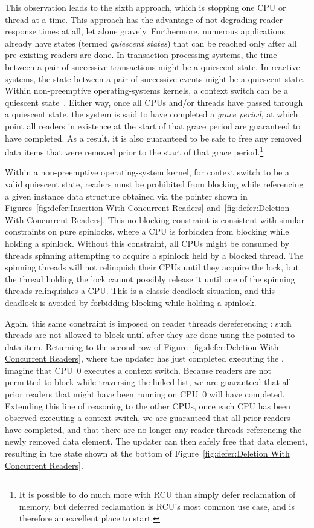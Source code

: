 This observation leads to the sixth approach, which is stopping
one CPU or thread at a time.
This approach has the advantage of not degrading reader response times
at all, let alone gravely.
Furthermore, numerous applications already have states (termed
\emph{quiescent states}) that can be
reached only after all pre-existing readers are done.
In transaction-processing systems, the time between a pair of
successive transactions might be a quiescent state.
In reactive systems, the state between a pair of successive events
might be a quiescent state.
Within non-preemptive operating-systems kernels, a context switch can be
a quiescent state~\cite{McKenney98}.
Either way, once all CPUs and/or threads have passed through a quiescent
state, the system is said to have completed a \emph{grace period},
at which point all readers in existence at the start of that grace period
are guaranteed to have completed.
As a result, it is also guaranteed to be safe to free any removed data
items that were removed prior to the start of that grace period.\footnote{
	It is possible to do much more with RCU than simply defer
	reclamation of memory, but deferred reclamation is RCU's most
	common use case, and is therefore an excellent place to start.}

Within a non-preemptive operating-system kernel, for context switch to be
a valid quiescent state, readers must be prohibited from blocking while
referencing a given instance data structure obtained via the 
pointer shown in
Figures~\ref{fig:defer:Insertion With Concurrent Readers}
and~\ref{fig:defer:Deletion With Concurrent Readers}.
This no-blocking constraint is consistent with similar constraints
on pure spinlocks, where a CPU is forbidden from blocking while
holding a spinlock.
Without this constraint, all CPUs might be consumed by threads
spinning attempting to acquire a spinlock held by a blocked thread.
The spinning threads will not relinquish their CPUs until they acquire
the lock, but the thread holding the lock cannot possibly release it
until one of the spinning threads relinquishes a CPU\@.
This is a classic deadlock situation, and this deadlock is avoided
by forbidding blocking while holding a spinlock.

Again, this same constraint is imposed on reader threads dereferencing
: such threads are not allowed to block until after
they are done using the pointed-to data item.
Returning to the second row of
Figure~\ref{fig:defer:Deletion With Concurrent Readers},
where the updater has just completed executing the ,
imagine that CPU~0 executes a context switch.
Because readers are not permitted to block while traversing the linked
list, we are guaranteed that all prior readers that might have been running on
CPU~0 will have completed.
Extending this line of reasoning to the other CPUs, once each CPU has
been observed executing a context switch, we are guaranteed that all
prior readers have completed, and that there are no longer any reader
threads referencing the newly removed data element.
The updater can then safely free that data element, resulting in the
state shown at the bottom of
Figure~\ref{fig:defer:Deletion With Concurrent Readers}.

